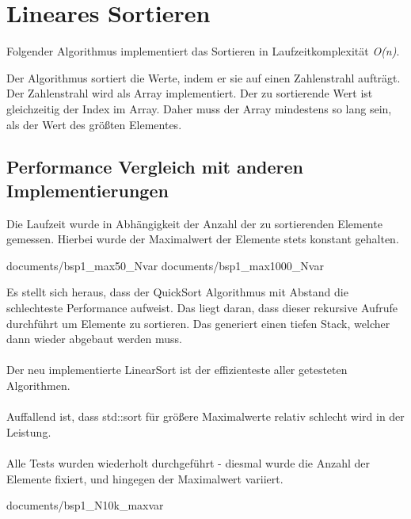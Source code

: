 \section{Lineares Sortieren}

Folgender Algorithmus implementiert das Sortieren in Laufzeitkomplexität \textit{O(n)}.\\


Der Algorithmus sortiert die Werte, indem er sie auf einen Zahlenstrahl aufträgt. Der Zahlenstrahl wird als Array implementiert. Der zu sortierende Wert ist gleichzeitig der Index im Array. Daher muss der Array mindestens so lang sein, als der Wert des größten Elementes.

\subsection{Performance Vergleich mit anderen Implementierungen}

Die Laufzeit wurde in Abhängigkeit der Anzahl der zu sortierenden Elemente gemessen. Hierbei wurde der Maximalwert der Elemente stets konstant gehalten.

	 {documents/bsp1_max50_Nvar}
	 {documents/bsp1_max1000_Nvar}
	
Es stellt sich heraus, dass der QuickSort Algorithmus mit Abstand die schlechteste Performance aufweist. Das liegt daran, dass dieser rekursive Aufrufe durchführt um Elemente zu sortieren. Das generiert einen tiefen Stack, welcher dann wieder abgebaut werden muss.\\
\\
Der neu implementierte LinearSort ist der effizienteste aller getesteten Algorithmen.\\
\\
Auffallend ist, dass std::sort für größere Maximalwerte relativ schlecht wird in der Leistung.\\
\\
Alle Tests wurden wiederholt durchgeführt - diesmal wurde die Anzahl der Elemente fixiert, und hingegen der Maximalwert variiert.

	 {documents/bsp1_N10k_maxvar}


